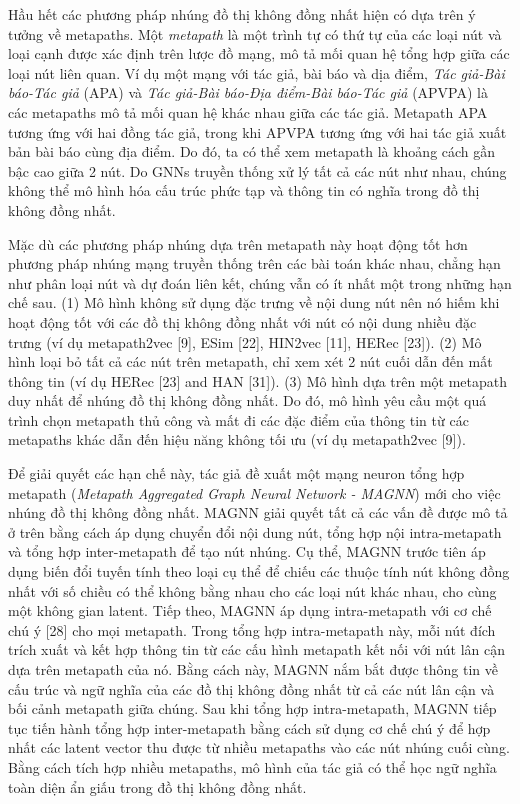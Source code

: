  Hầu hết các phương pháp nhúng đồ thị không đồng nhất hiện có dựa trên ý tưởng về metapaths. Một \textit{metapath} là một trình tự có thứ tự của các loại nút và loại cạnh được xác định trên lược đồ mạng, mô tả mối quan hệ tổng hợp giữa các loại nút liên quan. Ví dụ một mạng với tác giả, bài báo và dịa điểm, \textit{Tác giả-Bài báo-Tác giả} (APA) và \textit{Tác giả-Bài báo-Địa điểm-Bài báo-Tác giả} (APVPA) là các metapaths mô tả mối quan hệ khác nhau giữa các tác giả. Metapath APA tương ứng với hai đồng tác giả, trong khi APVPA tương ứng với hai tác giả xuất bản bài báo cùng địa điểm. Do đó, ta có thể xem metapath là khoảng cách gần bậc cao giữa 2 nút. Do GNNs truyền thống xử lý tất cả các nút như nhau, chúng không thể mô hình hóa cấu trúc phức tạp và thông tin có nghĩa trong đồ thị không đồng nhất.


 Mặc dù các phương pháp nhúng dựa trên metapath này hoạt động tốt hơn phương pháp nhúng mạng truyền thống trên các bài toán khác nhau, chẳng hạn như phân loại nút và dự đoán liên kết, chúng vẫn có ít nhất một trong những hạn chế sau. (1) Mô hình không sử dụng đặc trưng về nội dung nút nên nó hiếm khi hoạt động tốt với các đồ thị không đồng nhất với nút có nội dung nhiều đặc trưng (ví dụ metapath2vec [9], ESim [22], HIN2vec [11], HERec [23]). (2) Mô hình loại bỏ tất cả các nút trên metapath, chỉ xem xét 2 nút cuối dẫn đến mất thông tin (ví dụ HERec [23] and HAN [31]). (3) Mô hình dựa trên một metapath duy nhất để nhúng đồ thị không đồng nhất. Do đó, mô hình yêu cầu một quá trình chọn metapath thủ công và mất đi các đặc điểm của thông tin từ các metapaths khác dẫn đến hiệu năng không tối ưu (ví dụ metapath2vec [9]). 

 Để giải quyết các hạn chế này, tác giả đề xuất một mạng neuron tổng hợp metapath (\textit{Metapath Aggregated Graph Neural Network - MAGNN}) mới cho việc nhúng đồ thị không đồng nhất. MAGNN giải quyết tất cả các vấn đề được mô tả ở trên bằng cách áp dụng chuyển đổi nội dung nút, tổng hợp nội intra-metapath và tổng hợp inter-metapath để tạo nút nhúng. Cụ thể, MAGNN trước tiên áp dụng biến đổi tuyến tính theo loại cụ thể để chiếu các thuộc tính nút không đồng nhất với số chiều có thể không bằng nhau cho các loại nút khác nhau, cho cùng một không gian latent. Tiếp theo, MAGNN áp dụng intra-metapath với cơ chế chú ý [28] cho mọi metapath. Trong tổng hợp intra-metapath này, mỗi nút đích trích xuất và kết hợp thông tin từ các cấu hình metapath kết nối với nút lân cận dựa trên metapath của nó. Bằng cách này, MAGNN nắm bắt được thông tin về cấu trúc và ngữ nghĩa của các đồ thị không đồng nhất từ cả các nút lân cận và bối cảnh metapath giữa chúng. Sau khi tổng hợp intra-metapath, MAGNN tiếp tục tiến hành tổng hợp inter-metapath bằng cách sử dụng cơ chế chú ý để hợp nhất các latent vector thu được từ nhiều metapaths vào các nút nhúng cuối cùng. Bằng cách tích hợp nhiều metapaths, mô hình của tác giả có thể học ngữ nghĩa toàn diện ẩn giấu trong đồ thị không đồng nhất. 


